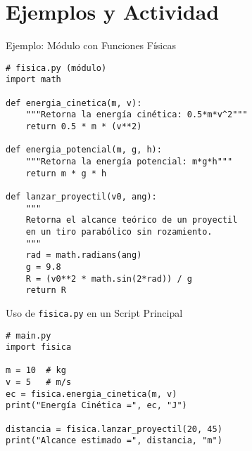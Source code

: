 \documentclass[10pt]{beamer}
\begin{document}
\section{Ejemplos y Actividad}

\begin{frame}[fragile]{Ejemplo: Módulo con Funciones Físicas}
\begin{verbatim}
# fisica.py (módulo)
import math

def energia_cinetica(m, v):
    """Retorna la energía cinética: 0.5*m*v^2"""
    return 0.5 * m * (v**2)

def energia_potencial(m, g, h):
    """Retorna la energía potencial: m*g*h"""
    return m * g * h

def lanzar_proyectil(v0, ang):
    """
    Retorna el alcance teórico de un proyectil
    en un tiro parabólico sin rozamiento.
    """
    rad = math.radians(ang)
    g = 9.8
    R = (v0**2 * math.sin(2*rad)) / g
    return R
\end{verbatim}
\end{frame}

\begin{frame}[fragile]{Uso de \texttt{fisica.py} en un Script Principal}
\begin{verbatim}
# main.py
import fisica

m = 10  # kg
v = 5   # m/s
ec = fisica.energia_cinetica(m, v)
print("Energía Cinética =", ec, "J")

distancia = fisica.lanzar_proyectil(20, 45)
print("Alcance estimado =", distancia, "m")
\end{verbatim}
\end{frame}
\end{document}
